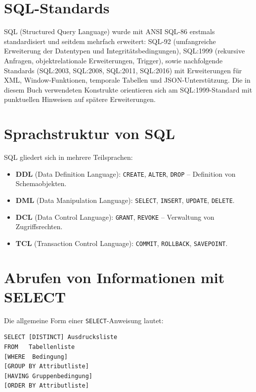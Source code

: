 ﻿\documentclass[a4paper,12pt]{report}
\theoremstyle{definition}
\theoremstyle{remark}
\begin{document}
\section{SQL-Standards}
\label{sec:sql-standards}

SQL (Structured Query Language) wurde mit ANSI SQL-86 erstmals
standardisiert und seitdem mehrfach erweitert: SQL-92 (umfangreiche
Erweiterung der Datentypen und Integritätsbedingungen), SQL:1999
(rekursive Anfragen, objektrelationale Erweiterungen, Trigger), sowie
nachfolgende Standards (SQL:2003, SQL:2008, SQL:2011, SQL:2016) mit
Erweiterungen für XML, Window-Funktionen, temporale Tabellen und
JSON-Unterstützung. Die in diesem Buch verwendeten Konstrukte
orientieren sich am SQL:1999-Standard mit punktuellen Hinweisen auf
spätere Erweiterungen.

\section{Sprachstruktur von SQL}

SQL gliedert sich in mehrere Teilsprachen:

\begin{itemize}
  \item \textbf{DDL} (Data Definition Language): \texttt{CREATE},
    \texttt{ALTER}, \texttt{DROP} -- Definition von Schemaobjekten.
  \item \textbf{DML} (Data Manipulation Language): \texttt{SELECT},
    \texttt{INSERT}, \texttt{UPDATE}, \texttt{DELETE}.
  \item \textbf{DCL} (Data Control Language): \texttt{GRANT},
    \texttt{REVOKE} -- Verwaltung von Zugriffsrechten.
  \item \textbf{TCL} (Transaction Control Language): \texttt{COMMIT},
    \texttt{ROLLBACK}, \texttt{SAVEPOINT}.
\end{itemize}

\section{Abrufen von Informationen mit SELECT}
\label{sec:select}

Die allgemeine Form einer \texttt{SELECT}-Anweisung lautet:

\begin{lstlisting}
SELECT [DISTINCT] Ausdrucksliste
FROM   Tabellenliste
[WHERE  Bedingung]
[GROUP BY Attributliste]
[HAVING Gruppenbedingung]
[ORDER BY Attributliste]
\end{lstlisting}
\end{document}
